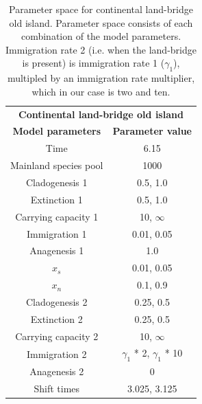 \begin{table}[h]
    \centering
    \caption{Parameter space for continental land-bridge old island. Parameter space consists of each combination of the model parameters. Immigration rate 2 (i.e. when the land-bridge is present) is immigration rate 1 ($\gamma_1$), multipled by an immigration rate multiplier, which in our case is two and ten.}
    \begin{tabular}{ c | c }
        \multicolumn{2}{c}{\textbf{Continental land-bridge old island}} \\
        \textbf{Model parameters} & \textbf{Parameter value} \\ 
        \hline
        \hline
        Time & 6.15 \\
        \hline
        Mainland species pool & 1000 \\
        \hline
        Cladogenesis 1 & 0.5, 1.0 \\
        \hline
        Extinction 1 & 0.5, 1.0 \\
        \hline
        Carrying capacity 1 & 10, $\infty$ \\
        \hline
        Immigration 1 & 0.01, 0.05 \\
        \hline
        Anagenesis 1 & 1.0 \\
        \hline
        $x_s$ & 0.01, 0.05 \\
        \hline
        $x_n$ & 0.1, 0.9 \\
        \hline
        Cladogenesis 2 & 0.25, 0.5 \\
        \hline
        Extinction 2 & 0.25, 0.5 \\
        \hline
        Carrying capacity 2 & 10, $\infty$ \\
        \hline
        Immigration 2 & $\gamma_1$ * 2, $\gamma_1$ * 10 \\ 
        \hline 
        Anagenesis 2 & 0 \\
        \hline
        Shift times & 3.025, 3.125 \\
    \end{tabular}
    \label{tab:oceanic_ontogeny_sea_level_young}
\end{table}

